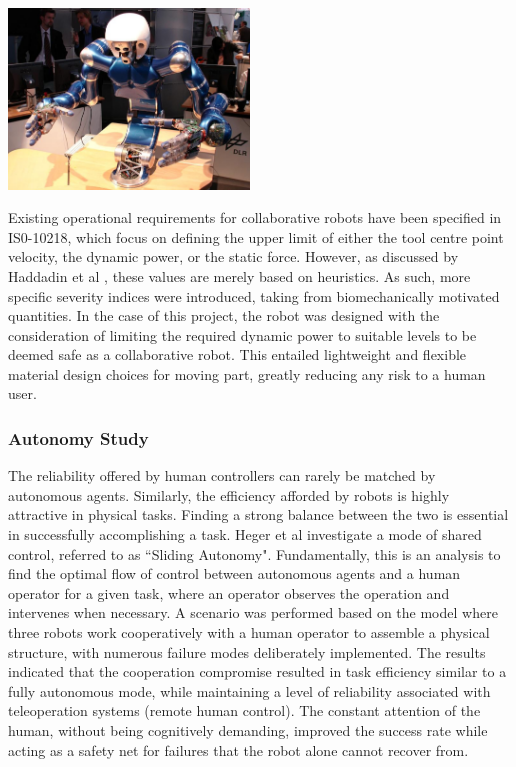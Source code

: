 \documentclass[11pt]{article}
\begin{document}
\begin{center}
\includegraphics[width=0.48\textwidth]{humanoid.png}
\label{figure:humanoid}
\end{center}

Existing operational requirements for collaborative robots have been specified in IS0-10218, which focus on defining the upper limit of either the tool centre point velocity, the dynamic power, or the static force. However, as discussed by Haddadin et al \cite{Haddadin2007}, these values are merely based on heuristics. As such, more specific severity indices were introduced, taking from biomechanically motivated quantities. In the case of this project, the robot was designed with the consideration of limiting the required dynamic power to suitable levels to be deemed safe as a collaborative robot. This entailed lightweight and flexible material design choices for moving part, greatly reducing any risk to a human user.

\subsubsection{Autonomy Study}
The reliability offered by human controllers can rarely be matched by autonomous agents. Similarly, the efficiency afforded by robots is highly attractive in physical tasks. Finding a strong balance between the two is essential in successfully accomplishing a task. Heger et al \cite{heger2006} investigate a mode of shared control, referred to as ``Sliding Autonomy". Fundamentally, this is an analysis to find the optimal flow of control between autonomous agents and a human operator for a given task, where an operator observes the operation and intervenes when necessary. A scenario was performed based on the model where three robots work cooperatively with a human operator to assemble a physical structure, with numerous failure modes deliberately implemented. The results indicated that the cooperation compromise resulted in task efficiency similar to a fully autonomous mode, while maintaining a level of reliability associated with teleoperation systems (remote human control). The constant attention of the human, without being cognitively demanding, improved the success rate while acting as a safety net for failures that the robot alone cannot recover from.
\end{document}
